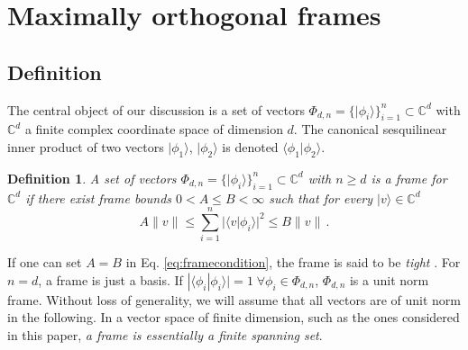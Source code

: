 \documentclass[%
superscriptaddress,
amsmath,amssymb,
 aps,
pra,
floatfix,
]{revtex4-2}
\newtheorem{definition}{Definition}[section]
\newcommand\norm[1]{\lVert#1\rVert}
\begin{document}
\section{Maximally orthogonal frames}
\label{definition}
\subsection{Definition}

The central object of our discussion is a set of vectors $\Phi_{d, n} = \{ |\phi_i\rangle \}_{i=1}^{n} \subset \mathbb C^d$ with $\mathbb C^d$ a finite complex coordinate space of dimension $d$. The canonical sesquilinear inner product of two vectors $|\phi_1\rangle$, $|\phi_2 \rangle$ is denoted $\langle \phi_1 | \phi_2 \rangle$. 
%
\begin{definition}
    \cite{duffin1952a} A set of vectors $\Phi_{d, n} = \{ |\phi_i\rangle \}_{i=1}^{n} \subset \mathbb C^d$ with $n\geq d$ is a frame for $\mathbb C^d$ if there exist frame bounds $0 < A \leq B < \infty$ such that for every $|v\rangle \in \mathbb C^d$
    \begin{equation}
        A \norm{v} \leq \sum_{i=1}^n |\langle v | \phi_i \rangle|^2 \leq B \norm{v} \,.
        \label{eq:framecondition}
    \end{equation}
    \label{def:frame}
\end{definition}
%
If one can set $A=B$ in Eq. \eqref{eq:framecondition}, the frame is said to be \emph{tight} \cite{waldron2018introduction}. For $n = d$, a frame is just a basis. If $|\langle \phi_i | \phi_i \rangle | = 1 \; \forall \phi_i \in \Phi_{d, n}$, $\Phi_{d, n}$ is a unit norm frame.
Without loss of generality, we will assume that all vectors are of unit norm in the following. In a vector space of finite dimension, such as the ones considered in this paper, \emph{a frame is essentially a finite spanning set}.
\end{document}
